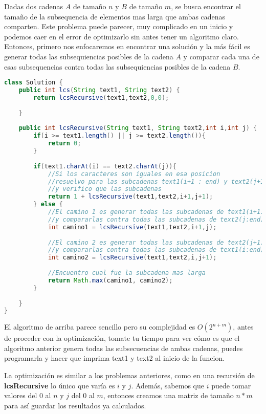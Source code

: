  Dadas dos cadenas $A$ de tamaño $n$ y $B$ de tamaño $m$, se busca encontrar el tamaño de la subsequencia de elementos mas larga que ambas cadenas comparten. Este problema puede parecer, muy complicado en un inicio y podemos caer en el error de optimizarlo sin antes tener un algoritmo claro. Entonces, primero nos enfocaremos en encontrar una solución y la más fácil es generar todas las subsequiencias posibles de la cadena $A$ y comparar cada una de esas subsequencias contra todas las subsequiencias posibles de la cadena $B$.
 
\begin{lstlisting}[language=Java, caption=LCS no optimo]
class Solution {
    public int lcs(String text1, String text2) {
        return lcsRecursive(text1,text2,0,0);
        
    }
    
    public int lcsRecursive(String text1, String text2,int i,int j) {
        if(i >= text1.length() || j >= text2.length()){
            return 0;
        }
        
        if(text1.charAt(i) == text2.charAt(j)){
            //Si los caracteres son iguales en esa posicion
            //resuelvo para las subcadenas text1(i+1 : end) y text2(j+1 : end)
            //y verifico que las subcadenas
            return 1 + lcsRecursive(text1,text2,i+1,j+1);
        } else {
            //El camino 1 es generar todas las subcadenas de text1(i+1:end)
            //y compararlas contra todas las subcadenas de text2(j:end)
            int camino1 = lcsRecursive(text1,text2,i+1,j);
            
            //El camino 2 es generar todas las subcadenas de text2(j+1:end)
            //y compararlas contra todas las subcadenas de text1(i:end)
            int camino2 = lcsRecursive(text1,text2,i,j+1);
            
            //Encuentro cual fue la subcadena mas larga
            return Math.max(camino1, camino2); 
        }
        
    }
}
\end{lstlisting}

El algoritmo de arriba parece sencillo pero su complejidad es $O(2^{n+m})$, antes de proceder con la optimización, tomate tu tiempo para ver cómo es que el algoritmo anterior genera todas las subsecuencias de ambas cadenas, puedes programarla y hacer que imprima text1 y text2 al inicio de la funcion.

La optimización es similar a los problemas anteriores, como en una recursión de \textbf{lcsRecursive} lo único que varía es $i$ y $j$.  Además, sabemos que $i$ puede tomar valores del $0$ al $n$ y $j$ del $0$ al $m$, entonces creamos una matriz de tamaño $n*m$ para así guardar los resultados ya calculados.


